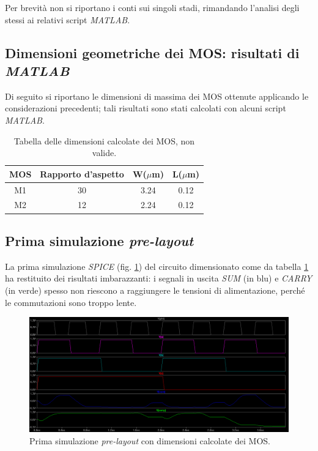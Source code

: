 Per brevità non si riportano i conti sui singoli stadi, rimandando l'analisi degli stessi ai relativi script \textit{MATLAB}.

\subsection{Dimensioni geometriche dei MOS: risultati di \textit{MATLAB}}

Di seguito si riportano le dimensioni di massima dei MOS ottenute applicando le considerazioni precedenti; tali risultati sono stati calcolati con alcuni script \textit{MATLAB}.

\begin{table}[htb]
	\centering
	\begin{tabular}{c*{3}{c}}
		\toprule
		MOS & Rapporto d'aspetto & W($\mu$m) & L($\mu$m)\\
		\midrule
		M1 & 30 & 3.24 & 0.12\\
		M2 & 12 & 2.24 & 0.12\\
		\bottomrule
	\end{tabular}
	\caption{Tabella delle dimensioni calcolate dei MOS, non valide.}
	\label{tab:dimensioniMosTeoriche}
\end{table}

\subsection{Prima simulazione \textit{pre-layout}}
La prima simulazione \textit{SPICE} (fig. \ref{fig:primaSimulazionePreLayout}) del circuito dimensionato come da tabella \ref{tab:dimensioniMosTeoriche} ha restituito dei risultati imbarazzanti: i segnali in uscita \textit{SUM} (in blu) e \textit{CARRY} (in verde) spesso non riescono a raggiungere le tensioni di alimentazione, perché le commutazioni sono troppo lente.

\begin{figure}[hbt!]
	\centering
	\includegraphics[width=1\textwidth]{figure/sim_FA_Bad.png}
	\caption{Prima simulazione \textit{pre-layout} con dimensioni calcolate dei MOS.}
	\label{fig:primaSimulazionePreLayout}
\end{figure}

